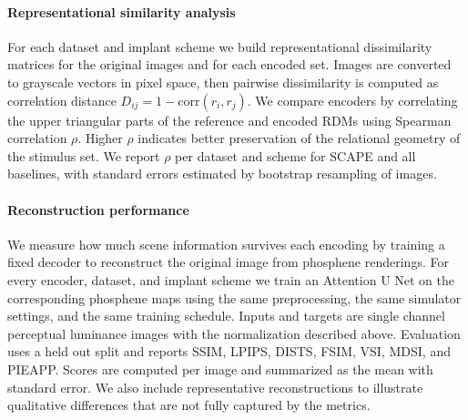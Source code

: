 \paragraph{Representational similarity analysis}
For each dataset and implant scheme we build representational dissimilarity matrices for the original images and for each encoded set. Images are converted to grayscale vectors in pixel space, then pairwise dissimilarity is computed as correlation distance \(D_{ij}=1-\mathrm{corr}(r_i,r_j)\). We compare encoders by correlating the upper triangular parts of the reference and encoded RDMs using Spearman correlation \(\rho\). Higher \(\rho\) indicates better preservation of the relational geometry of the stimulus set. We report \(\rho\) per dataset and scheme for SCAPE and all baselines, with standard errors estimated by bootstrap resampling of images.

\paragraph{Reconstruction performance}
We measure how much scene information survives each encoding by training a fixed decoder to reconstruct the original image from phosphene renderings. For every encoder, dataset, and implant scheme we train an Attention U Net on the corresponding phosphene maps using the same preprocessing, the same simulator settings, and the same training schedule. Inputs and targets are single channel perceptual luminance images with the normalization described above. Evaluation uses a held out split and reports SSIM, LPIPS, DISTS, FSIM, VSI, MDSI, and PIEAPP. Scores are computed per image and summarized as the mean with standard error. We also include representative reconstructions to illustrate qualitative differences that are not fully captured by the metrics.
